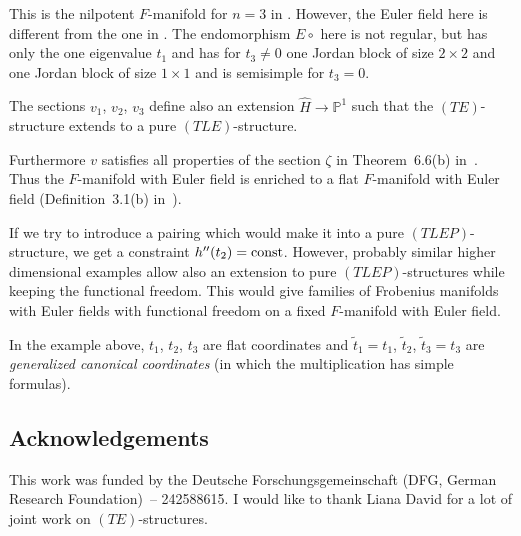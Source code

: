 \documentclass[10pt,a4paper]{amsart}
\numberwithin{equation}{section}
\numberwithin{figure}{section}
\renewcommand{\P}{{\mathbb P}}
\newcommand{\www}{\widetilde}
\newcommand{\wwh}{\widehat}
\begin{document}
This is the nilpotent $F$-manifold for $n=3$ in
\cite[Theorem~3]{DH17}.
However, the Euler field here is different from the one in
\cite[Theorem~3]{DH17}. The endomorphism $E\circ$ here is not
regular, but has only the one eigenvalue $t_1$ and
has for $t_3\neq 0$ one Jordan block of size
$2\times 2$ and one Jordan block of size $1\times 1$
and is semisimple for $t_3=0$.

The sections $v_1$, $v_2$, $v_3$ define also an
extension $\wwh{H}\to\P^1$ such that the $(TE)$-structure
extends to a pure $(TLE)$-structure.

Furthermore $v$ satisfies all properties of the
section $\zeta$ in Theorem~6.6(b) in~\cite{DH20-2}.
Thus the $F$-manifold with Euler field is enriched to a
flat $F$-manifold with Euler field (Definition~3.1(b) in~\cite{DH20-2}).

If we try to introduce a pairing which would make it
into a pure $(TLEP)$-structure, we get a constraint
$h''(t_2)={\rm const}$. However, probably similar higher dimensional
examples allow also an extension to pure $(TLEP)$-structures
while keeping the functional freedom.
This would give families of Frobenius manifolds with
Euler fields with functional freedom on a fixed $F$-manifold
with Euler field.

In the example above, $t_1$, $t_2$, $t_3$ are flat coordinates
and $\www t_1=t_1$, $\www t_2$, $\www t_3=t_3$ are
{\it generalized canonical coordinates}
(in which the multiplication has simple formulas).

\subsection*{Acknowledgements}

This work was funded by the Deutsche Forschungsgemeinschaft (DFG, German Research Foundation)~-- 242588615. I would like to thank Liana David for a lot of joint work on $(TE)$-structures.

\end{document}
